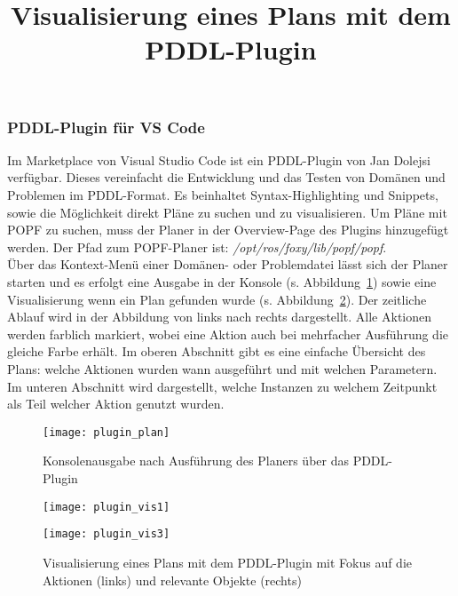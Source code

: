 \subsubsection{\acs{PDDL}-Plugin für VS Code}
Im Marketplace von Visual Studio Code ist ein PDDL-Plugin von Jan Dolejsi verfügbar.
Dieses vereinfacht die Entwicklung und das Testen von Domänen und Problemen im \ac{PDDL}-Format.
Es beinhaltet Syntax-Highlighting und Snippets, sowie die Möglichkeit direkt Pläne zu suchen und zu visualisieren.
Um Pläne mit \ac{POPF} zu suchen, muss der Planer in der Overview-Page des Plugins hinzugefügt werden.
Der Pfad zum \ac{POPF}-Planer ist: \emph{/opt/ros/foxy/lib/popf/popf}.\\
Über das Kontext-Menü einer Domänen- oder Problemdatei lässt sich der Planer starten und es erfolgt eine Ausgabe in der Konsole (s. Abbildung~\ref{fig:pluginplan}) sowie eine Visualisierung wenn ein Plan gefunden wurde (s. Abbildung~\ref{fig:pluginvis}).
Der zeitliche Ablauf wird in der Abbildung von links nach rechts dargestellt.
Alle Aktionen werden farblich markiert, wobei eine Aktion auch bei mehrfacher Ausführung die gleiche Farbe erhält.
Im oberen Abschnitt gibt es eine einfache Übersicht des Plans: welche Aktionen wurden wann ausgeführt und mit welchen Parametern.
Im unteren Abschnitt wird dargestellt, welche Instanzen zu welchem Zeitpunkt als Teil welcher Aktion genutzt wurden.
\begin{figure}[ht!]
    \centering
    \texttt{[image: plugin\_plan]}
    \caption{Konsolenausgabe nach Ausführung des Planers über das \acs{PDDL}-Plugin}
    \label{fig:pluginplan}
\end{figure}

\begin{figure}[ht!]
    \centering
    \begin{minipage}[t]{0.45\linewidth}
        \centering
        \texttt{[image: plugin\_vis1]}
    \end{minipage}%
    \hfill
    \begin{minipage}[t]{0.45\linewidth}
        \centering
        \texttt{[image: plugin\_vis3]}
    \end{minipage}
    \title{Visualisierung eines Plans mit dem PDDL-Plugin}
    \caption{Visualisierung eines Plans mit dem \acs{PDDL}-Plugin mit Fokus auf die Aktionen (links) und relevante Objekte (rechts)}
    \label{fig:pluginvis}
\end{figure}
